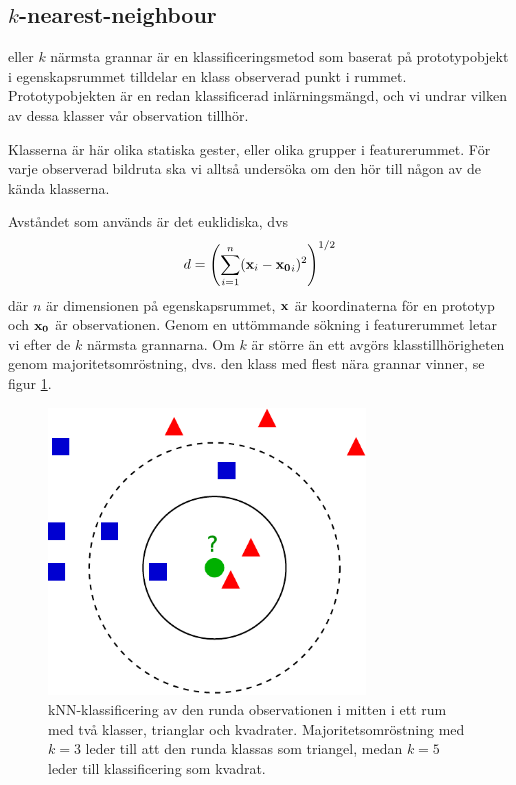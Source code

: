 \documentclass[../rapport_MVEX01-11-05]{subfiles}
\begin{document}
\subsection{$k$-nearest-neighbour}\label{sec:knn}

\knn eller $k$ närmsta grannar är en klassificeringsmetod som baserat på
prototypobjekt i egenskapsrummet tilldelar en klass observerad punkt i rummet.
Prototypobjekten är en redan klassificerad inlärningsmängd, och vi undrar vilken
av dessa klasser vår observation tillhör.

Klasserna är här olika statiska gester, eller olika grupper i featurerummet. För
varje observerad bildruta ska vi alltså undersöka om den hör till någon av de
kända klasserna.

Avståndet som används är det euklidiska, dvs
\begin{equation*}
    d = \left(\sum_{i=1}^n(\mathbf{x}_i-\mathbf{x_0}_i)^2\right)^{1/2}
\end{equation*}
där $n$ är dimensionen på egenskapsrummet, $\mathbf{x}$ är koordinaterna för en
prototyp och $\mathbf{x_0}$ är observationen. Genom en uttömmande sökning i
featurerummet letar vi efter de $k$ närmsta grannarna. Om $k$ är större än ett
avgörs klasstillhörigheten genom majoritetsomröstning, dvs. den klass med flest
nära grannar vinner, se figur \ref{fig:knn-overview}.

\begin{figure}[!htb]
    \begin{center}
\includegraphics[width=0.75\textwidth]{bilder/KnnClassification}
    \end{center}
    \caption{kNN-klassificering av den runda observationen i mitten i ett rum
    med två klasser, trianglar och kvadrater. Majoritetsomröstning
    med $k=3$ leder till att den runda klassas som triangel, medan $k=5$ leder
    till klassificering som kvadrat.}
    \label{fig:knn-overview}
\end{figure}
\end{document}
